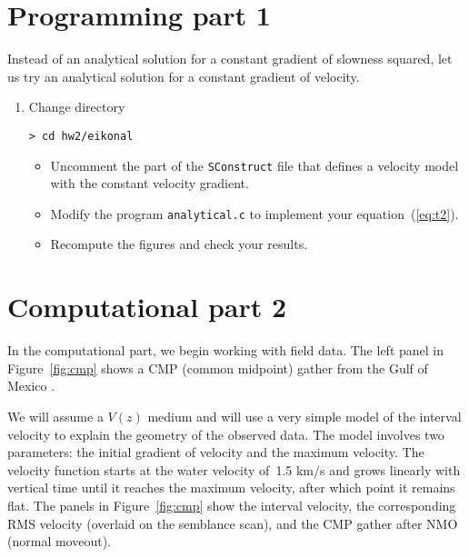 \section{Programming part 1}

Instead of an analytical solution for a constant 
    gradient of slowness squared, let us try an analytical solution for a constant
    gradient of velocity.   

\begin{enumerate}
  \item Change directory
\begin{verbatim}
> cd hw2/eikonal
\end{verbatim}
    \begin{itemize}
    \item Uncomment the part of the
    \texttt{SConstruct} file that defines a velocity model with the
    constant velocity gradient. 
    \item Modify the program \texttt{analytical.c} to implement your equation~(\ref{eq:t2}).
    \item Recompute the figures and check your results.
    \end{itemize}
  \end{enumerate}       

\lstset{language=c,numbers=left,numberstyle=\tiny,showstringspaces=false}


\lstset{language=fortran,numbers=left,numberstyle=\tiny,showstringspaces=false}


\section{Computational part 2}

In the computational part, we begin working with field data. The left
panel in Figure~\ref{fig:cmp} shows a CMP (common midpoint) gather
from the Gulf of Mexico \cite[]{bei}.

 
We will assume a $V(z)$ medium and will use a very simple model of the
interval velocity to explain the geometry of the observed data. The
model involves two parameters: the initial gradient of velocity and
the maximum velocity. The velocity function starts at the water
velocity of~1.5 km/s and grows linearly with vertical time until it
reaches the maximum velocity, after which point it remains flat. The
panels in Figure~\ref{fig:cmp} show the interval velocity, the
corresponding RMS velocity (overlaid on the semblance scan), and the
CMP gather after NMO (normal moveout). 

